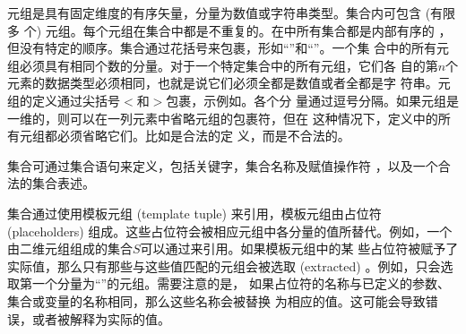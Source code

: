 元组是具有固定维度的有序矢量，分量为数值或字符串类型。集合内可包含 (有限多
个) 元组。每个元组在集合中都是不重复的。在\zimpl 中所有集合都是内部有序的
，但没有特定的顺序。集合通过花括号来包裹，形如“\code{\{}”和“\code{\}}”。一个集
合中的所有元组必须具有相同个数的分量。对于一个特定集合中的所有元组，它们各
自的第$n$个元素的数据类型必须相同，也就是说它们必须全都是数值或者全都是字
符串。元组的定义通过尖括号$<$和$>$包裹，示例如。各个分
量通过逗号分隔。如果元组是一维的，则可以在一列元素中省略元组的包裹符，但在
这种情况下，定义中的所有元组都必须省略它们。比如是合法的定
义，而是不合法的。

集合可通过集合语句来定义，包括关键字，集合名称及赋值操作符
\code{:=}，以及一个合法的集合表述。

集合通过使用模板元组 (template tuple) 来引用，模板元组由占位符 
(placeholders) 组成。这些占位符会被相应元组中各分量的值所替代。例如，一个
由二维元组组成的集合$S$可以通过来引用。如果模板元组中的某
些占位符被赋予了实际值，那么只有那些与这些值匹配的元组会被选取 (extracted) 
。例如，只会选取第一个分量为“”的元组。需要注意的是，
如果占位符的名称与已定义的参数、集合或变量的名称相同，那么这些名称会被替换
为相应的值。这可能会导致错误，或者被解释为实际的值。


